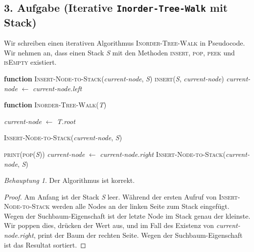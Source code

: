 \documentclass[draft,a5paper]{article}
\theoremstyle{remark}
\newtheorem*{beh}{Behauptung}
\begin{document}
\subsection*{3. Aufgabe (Iterative \texttt{Inorder-Tree-Walk} mit Stack)}

Wir schreiben einen iterativen Algorithmus \textsc{Inorder-Tree-Walk}
in Pseudocode.  Wir nehmen an, dass einen Stack \textit{S} mit den
Methoden \textsc{insert}, \textsc{pop}, \textsc{peek} und
\textsc{isEmpty} existiert.

\begin{algorithmic}
  \State \textbf{function} \textsc{Insert-Node-to-Stack}(\textit{current-node}, \textit{S})
  \State \textsc{insert}(\textit{S}, \textit{current-node})
  \State \textit{current-node} \(\gets\) \textit{current-node.left}
  \EndWhile

  \State \textbf{function} \textsc{Inorder-Tree-Walk}(\textit{T})

  \State \textit{current-node} \(\gets\) \textit{T.root}

  \State \textsc{Insert-Node-to-Stack}(\textit{current-node}, \textit{S})

  \State \textsc{print}(\textsc{pop}(\textit{S}))
  \State \textit{current-node} \(\gets\) \textit{current-node.right}
  \State \textsc{Insert-Node-to-Stack}(\textit{current-node}, \textit{S})
  \EndIf

\end{algorithmic}



\begin{beh}
  Der Algorithmus ist korrekt.
\end{beh}

\begin{proof}
  Am Anfang ist der Stack \textit{S} leer.  Während der ersten Aufruf
  von \textsc{Insert-Node-to-Stack} werden alle Nodes an der linken
  Seite zum Stack eingefügt.  Wegen der Suchbaum-Eigenschaft ist der
  letzte Node im Stack genau der kleinste.  Wir poppen dies, drücken
  der Wert aus, und im Fall des Existenz von
  \textit{current-node.right}, print der Baum der rechten Seite.
  Wegen der Suchbaum-Eigenschaft ist das Resultat sortiert.
\end{proof}
\end{document}
